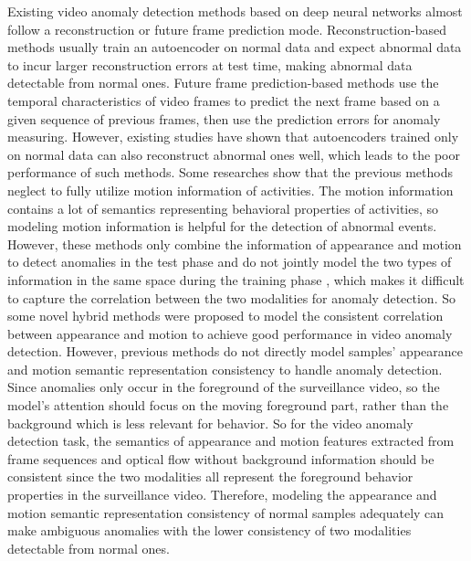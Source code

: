 \documentclass[sigconf]{acmart}
\begin{document}
Existing video anomaly detection methods based on deep neural networks almost follow a reconstruction or future frame prediction mode. Reconstruction-based methods \cite{hasan2016learning, luo2017remembering, gong2019memorizing, park2020learning} usually train an autoencoder on normal data and expect abnormal data to incur larger reconstruction errors at test time, making abnormal data detectable from normal ones. Future frame prediction-based methods \cite{liu2018future} use the temporal characteristics of video frames to predict the next frame based on a given sequence of previous frames, then use the prediction errors for anomaly measuring. However, existing studies \cite{gong2019memorizing, zaheer2020old, zong2018deep} have shown that autoencoders trained only on normal data can also reconstruct abnormal ones well, which leads to the poor performance of such methods. Some researches \cite{xu2017detecting, yan2018abnormal, vu2019robust} show that the previous methods neglect to fully utilize motion information of activities. The motion information contains a lot of semantics representing behavioral properties of activities, so modeling motion information is helpful for the detection of abnormal events. However, these methods only combine the information of appearance and motion to detect anomalies in the test phase and do not jointly model the two types of information in the same space during the training phase \cite{cai2021appearance}, which makes it difficult to capture the correlation between the two modalities for anomaly detection. So some novel hybrid methods \cite{cai2021appearance, liu2021hybrid} were proposed to model the consistent correlation between appearance and motion to achieve good performance in video anomaly detection. However, previous methods do not directly model samples' appearance and motion semantic representation consistency to handle anomaly detection. Since anomalies only occur in the foreground of the surveillance video, so the model’s attention should focus on the moving foreground part, rather than the background which is less relevant for behavior. So for the video anomaly detection task, the semantics of appearance and motion features extracted from frame sequences and optical flow without background information should be consistent since the two modalities all represent the foreground behavior properties in the surveillance video. Therefore, modeling the appearance and motion semantic representation consistency of normal samples adequately can make ambiguous anomalies with the lower consistency of two modalities detectable from normal ones.
  
\end{document}
